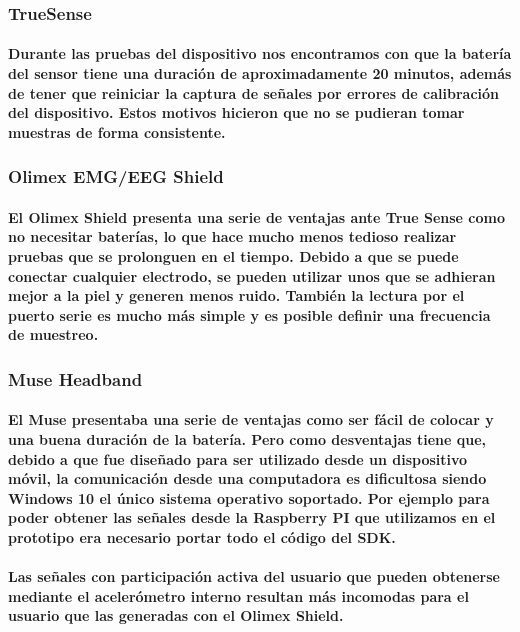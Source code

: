\documentclass{article}
\begin{document}
\subsubsection{TrueSense}
\paragraph{
Durante las pruebas del dispositivo nos encontramos con que la batería del sensor tiene una duración de aproximadamente 20 minutos, además de tener que reiniciar la captura de señales por errores de calibración del dispositivo. Estos motivos hicieron que no se pudieran tomar muestras de forma consistente.
}
\subsubsection{Olimex EMG/EEG Shield}
\paragraph{
El Olimex Shield presenta una serie de ventajas ante True Sense como no necesitar baterías, lo que hace mucho menos tedioso realizar pruebas que se prolonguen en el tiempo. Debido a que se puede conectar cualquier electrodo, se pueden utilizar unos que se adhieran mejor a la piel y generen menos ruido. También la lectura por el puerto serie es mucho más simple y es posible definir una frecuencia de muestreo.
}
\subsubsection{Muse Headband}
\paragraph{
El Muse presentaba una serie de ventajas como ser fácil de colocar y una buena duración de la batería. Pero como desventajas tiene que, debido a que fue diseñado para ser utilizado desde un dispositivo móvil, la comunicación desde una computadora es dificultosa siendo Windows 10 el único sistema operativo soportado. Por ejemplo para poder obtener las señales desde la Raspberry PI que utilizamos en el prototipo era necesario portar todo el código del SDK.
}
\paragraph{
Las señales con participación activa del usuario que pueden obtenerse mediante el acelerómetro interno resultan más incomodas para el usuario que las generadas con el Olimex Shield.
}
\end{document}
